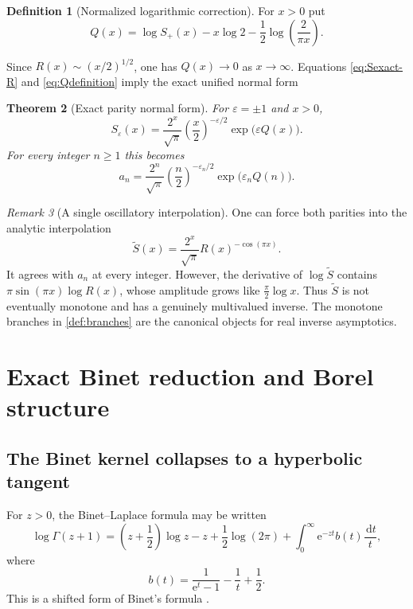 \documentclass[11pt]{article}
\newtheorem{theorem}{Theorem}[section]
\theoremstyle{definition}
\newtheorem{definition}[theorem]{Definition}
\theoremstyle{remark}
\newtheorem{remark}[theorem]{Remark}
\newcommand{\eps}{\varepsilon}
\newcommand{\dd}{\,\mathrm d}
\newcommand{\e}{\mathrm e}
\begin{document}
\begin{definition}[Normalized logarithmic correction]\label{def:Q}
For $x>0$ put
\begin{equation}\label{eq:Qdefinition}
 Q(x)=\log S_+(x)-x\log2-\frac12\log\!\left(\frac{2}{\pi x}\right).
\end{equation}
\end{definition}
Since $R(x)\sim(x/2)^{1/2}$, one has $Q(x)\to0$ as $x\to\infty$.  Equations \eqref{eq:Sexact-R} and \eqref{eq:Qdefinition} imply the exact unified normal form
\begin{theorem}[Exact parity normal form]\label{thm:exact-normal}
For $\eps=\pm1$ and $x>0$,
\begin{equation}\label{eq:exact-normal}
 S_\eps(x)=\frac{2^x}{\sqrt\pi}
 \left(\frac{x}{2}\right)^{-\eps/2}\exp\!\bigl(\eps Q(x)\bigr).
\end{equation}
For every integer $n\ge1$ this becomes
\begin{equation}\label{eq:exact-discrete-normal}
 a_n=\frac{2^n}{\sqrt\pi}
 \left(\frac{n}{2}\right)^{-\eps_n/2}
 \exp\!\bigl(\eps_n Q(n)\bigr).
\end{equation}
\end{theorem}

\begin{remark}[A single oscillatory interpolation]
One can force both parities into the analytic interpolation
\[
 \widetilde S(x)=\frac{2^x}{\sqrt\pi}R(x)^{-\cos(\pi x)}.
\]
It agrees with $a_n$ at every integer.  However, the derivative of $\log\widetilde S$ contains
$\pi\sin(\pi x)\log R(x)$, whose amplitude grows like $\frac\pi2\log x$.  Thus $\widetilde S$ is not eventually monotone and has a genuinely multivalued inverse.  The monotone branches in \cref{def:branches} are the canonical objects for real inverse asymptotics.
\end{remark}

\section{Exact Binet reduction and Borel structure}

\subsection{The Binet kernel collapses to a hyperbolic tangent}

For $z>0$, the Binet--Laplace formula may be written
\begin{equation}\label{eq:Binet-gamma-plus1}
 \log\Gamma(z+1)=\left(z+\frac12\right)\log z-z+\frac12\log(2\pi)
 +\int_0^\infty \e^{-zt}b(t)\frac{\dd t}{t},
\end{equation}
where
\begin{equation}\label{eq:b-kernel}
 b(t)=\frac{1}{\e^t-1}-\frac1t+\frac12.
\end{equation}
This is a shifted form of Binet's formula \cite{DLMFBinet}.
\end{document}

